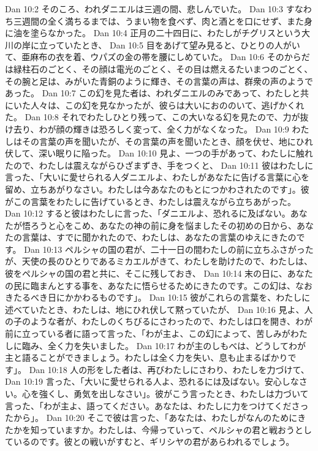 Dan 10:2  そのころ、われダニエルは三週の間、悲しんでいた。
Dan 10:3  すなわち三週間の全く満ちるまでは、うまい物を食べず、肉と酒とを口にせず、また身に油を塗らなかった。
Dan 10:4  正月の二十四日に、わたしがチグリスという大川の岸に立っていたとき、
Dan 10:5  目をあげて望み見ると、ひとりの人がいて、亜麻布の衣を着、ウパズの金の帯を腰にしめていた。
Dan 10:6  そのからだは緑柱石のごとく、その顔は電光のごとく、その目は燃えるたいまつのごとく、その腕と足は、みがいた青銅のように輝き、その言葉の声は、群衆の声のようであった。
Dan 10:7  この幻を見た者は、われダニエルのみであって、わたしと共にいた人々は、この幻を見なかったが、彼らは大いにおののいて、逃げかくれた。
Dan 10:8  それでわたしひとり残って、この大いなる幻を見たので、力が抜け去り、わが顔の輝きは恐ろしく変って、全く力がなくなった。
Dan 10:9  わたしはその言葉の声を聞いたが、その言葉の声を聞いたとき、顔を伏せ、地にひれ伏して、深い眠りに陥った。
Dan 10:10  見よ、一つの手があって、わたしに触れたので、わたしは震えながらひざまずき、手をつくと、
Dan 10:11  彼はわたしに言った、「大いに愛せられる人ダニエルよ、わたしがあなたに告げる言葉に心を留め、立ちあがりなさい。わたしは今あなたのもとにつかわされたのです」。彼がこの言葉をわたしに告げているとき、わたしは震えながら立ちあがった。
Dan 10:12  すると彼はわたしに言った、「ダニエルよ、恐れるに及ばない。あなたが悟ろうと心をこめ、あなたの神の前に身を悩ましたその初めの日から、あなたの言葉は、すでに聞かれたので、わたしは、あなたの言葉のゆえにきたのです。
Dan 10:13  ペルシャの国の君が、二十一日の間わたしの前に立ちふさがったが、天使の長のひとりであるミカエルがきて、わたしを助けたので、わたしは、彼をペルシャの国の君と共に、そこに残しておき、
Dan 10:14  末の日に、あなたの民に臨まんとする事を、あなたに悟らせるためにきたのです。この幻は、なおきたるべき日にかかわるものです」。
Dan 10:15  彼がこれらの言葉を、わたしに述べていたとき、わたしは、地にひれ伏して黙っていたが、
Dan 10:16  見よ、人の子のような者が、わたしのくちびるにさわったので、わたしは口を開き、わが前に立っている者に語って言った、「わが主よ、この幻によって、苦しみがわたしに臨み、全く力を失いました。
Dan 10:17  わが主のしもべは、どうしてわが主と語ることができましょう。わたしは全く力を失い、息も止まるばかりです」。
Dan 10:18  人の形をした者は、再びわたしにさわり、わたしを力づけて、
Dan 10:19  言った、「大いに愛せられる人よ、恐れるには及ばない。安心しなさい。心を強くし、勇気を出しなさい」。彼がこう言ったとき、わたしは力づいて言った、「わが主よ、語ってください。あなたは、わたしに力をつけてくださったから」。
Dan 10:20  そこで彼は言った、「あなたは、わたしがなんのためにきたかを知っていますか。わたしは、今帰っていって、ペルシャの君と戦おうとしているのです。彼との戦いがすむと、ギリシヤの君があらわれるでしょう。
